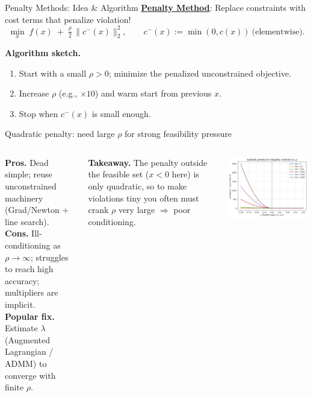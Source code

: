 \begin{frame}{Penalty Methods: Idea \& Algorithm}
\underline{\textbf{Penalty Method}}: Replace constraints with cost terms that penalize violation!
\[
\min_x\; f(x) \;+\; \tfrac{\rho}{2}\,\big\|c^-(x)\big\|_2^2,\qquad
c^-(x):=\min(0,c(x))\ \text{(elementwise)}.
\]

\textbf{Algorithm sketch.}
\begin{enumerate}
\item Start with a small $\rho>0$; minimize the penalized unconstrained objective.
\item Increase $\rho$ (e.g., $\times 10$) and warm start from previous $x$.
\item Stop when $c^-(x)$ is small enough.
\end{enumerate}
\end{frame}


\begin{frame}{Quadratic penalty: need large $\rho$ for strong feasibility pressure}
\begin{columns}[T,onlytextwidth]
\small
\textbf{Pros.} Dead simple; reuse unconstrained machinery (Grad/Newton + line search). \\
\textbf{Cons.} Ill-conditioning as $\rho\to\infty$; struggles to reach high accuracy; multipliers are implicit. \\
\textbf{Popular fix.} Estimate $\lambda$ (Augmented Lagrangian / ADMM) to converge with finite $\rho$.

\vspace{0.6em}
\textbf{Takeaway.} The penalty outside the feasible set ($x<0$ here) is only quadratic,
so to make violations tiny you often must crank $\rho$ very large $\Rightarrow$ poor conditioning.

\centering
\includegraphics[width=\textwidth]{figures/quadratic_penalty.png}
\end{columns}
\end{frame}







